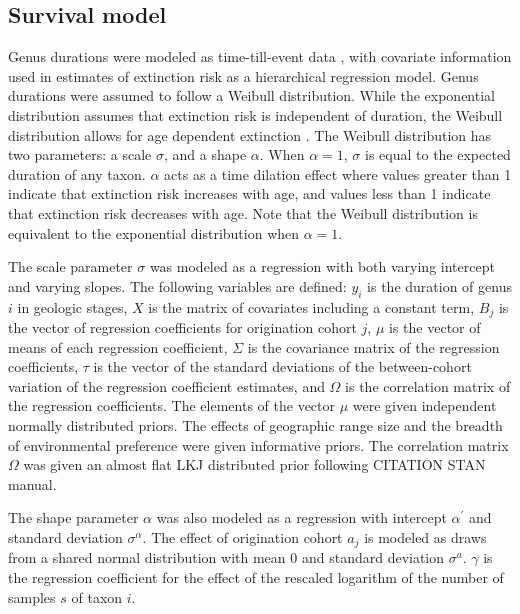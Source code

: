 \documentclass[12pt,letterpaper]{article}
\begin{document}
\subsection{Survival model}

Genus durations were modeled as time-till-event data \citep{Klein2003}, with covariate information used in estimates of extinction risk as a hierarchical regression model. Genus durations were assumed to follow a Weibull distribution. While the exponential distribution assumes that extinction risk is independent of duration, the Weibull distribution allows for age dependent extinction \citep{Klein2003}. The Weibull distribution has two parameters: a scale \(\sigma\), and a shape \(\alpha\). When \(\alpha = 1\), \(\sigma\) is equal to the expected duration of any taxon. \(\alpha\) acts as a time dilation effect where values greater than 1 indicate that extinction risk increases with age, and values less than 1 indicate that extinction risk decreases with age. Note that the Weibull distribution is equivalent to the exponential distribution when \(\alpha = 1\). 

The scale parameter \(\sigma\) was modeled as a regression with both varying intercept and varying slopes. The following variables are defined: \(y_{i}\) is the duration of genus \(i\) in geologic stages, \(X\) is the matrix of covariates including a constant term, \(B_{j}\) is the vector of regression coefficients for origination cohort \(j\), \(\mu\) is the vector of means of each regression coefficient, \(\Sigma\) is the covariance matrix of the regression coefficients, \(\tau\) is the vector of the standard deviations of the between-cohort variation of the regression coefficient estimates, and \(\Omega\) is the correlation matrix of the regression coefficients. The elements of the vector \(\mu\) were given independent normally distributed priors. The effects of geographic range size and the breadth of environmental preference were given informative priors. The correlation matrix \(\Omega\) was given an almost flat LKJ distributed prior following CITATION STAN manual.

The shape parameter \(\alpha\) was also modeled as a regression with intercept \(\alpha^{\prime}\) and standard deviation \(\sigma^{\alpha}\). The effect of origination cohort \(a_{j}\) is modeled as draws from a shared normal distribution with mean 0 and standard deviation \(\sigma^{a}\). \(\gamma\) is the regression coefficient for the effect of the rescaled logarithm of the number of samples \(s\) of taxon \(i\).
\end{document}

